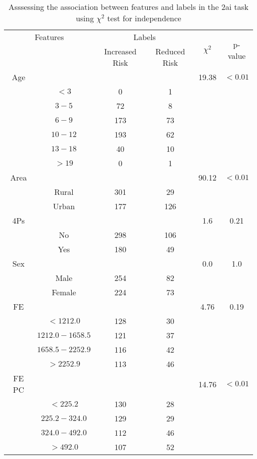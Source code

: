 \begin{table}[!htb]
\centering
\caption{Asssessing the association between features and labels in the 2ai task using $\chi^2$ test for independence}
\label{tab:chitest_2ai}
\begin{tabular}{c c | c c| c | c}
\hline
\multicolumn{2}{c|}{Features}& \multicolumn{2}{c|}{Labels}& \multirow{2}{*}{$\chi^2$} & \multirow{2}{*}{p-value}\\ 
& & Increased Risk & Reduced Risk & & \\ 
\hline
Age &  &  & & 19.38 & $< 0.01$ \\ 
& $< 3$ & 0 & 1& & \\ 
& $3-5$ & 72 & 8& & \\ 
& $6-9$ & 173 & 73& & \\ 
& $10-12$ & 193 & 62& & \\ 
& $13-18$ & 40 & 10& & \\ 
& $> 19$ & 0 & 1& & \\ 
\hline 
Area &  &  & & 90.12 & $< 0.01$ \\ 
& Rural & 301 & 29& & \\ 
& Urban & 177 & 126& & \\ 
\hline 
4Ps &  &  & & 1.6 & 0.21 \\ 
& No & 298 & 106& & \\ 
& Yes & 180 & 49& & \\ 
\hline 
Sex &  &  & & 0.0 & 1.0 \\ 
& Male & 254 & 82& & \\ 
& Female & 224 & 73& & \\ 
\hline 
FE &  &  & & 4.76 & 0.19 \\ 
& $< 1212.0$ & 128 & 30& & \\ 
& $1212.0-1658.5$ & 121 & 37& & \\ 
& $1658.5-2252.9$ & 116 & 42& & \\ 
& $> 2252.9$ & 113 & 46& & \\ 
\hline 
FE PC &  &  & & 14.76 & $< 0.01$ \\ 
& $< 225.2$ & 130 & 28& & \\ 
& $225.2-324.0$ & 129 & 29& & \\ 
& $324.0-492.0$ & 112 & 46& & \\ 
& $> 492.0$ & 107 & 52& & \\ 
\hline 
\end{tabular}
\end{table}

